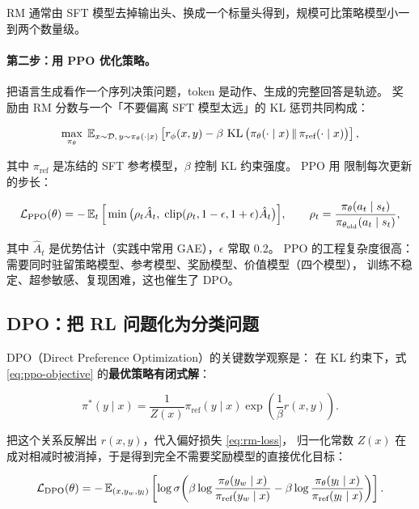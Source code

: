 RM 通常由 SFT 模型去掉输出头、换成一个标量头得到，规模可比策略模型小一到两个数量级。

\paragraph{第二步：用 PPO 优化策略。}
把语言生成看作一个序列决策问题，token 是动作、生成的完整回答是轨迹。
奖励由 RM 分数与一个「不要偏离 SFT 模型太远」的 KL 惩罚共同构成：

\begin{equation}
\max_{\pi_\theta} \; \operatorname{\mathbb{E}}_{x \sim \mathcal{D},\, y \sim \pi_\theta(\cdot \mid x)}
\left[ r_\phi(x, y) - \beta \, \operatorname{KL}\big( \pi_\theta(\cdot \mid x) \,\|\, \pi_{\text{ref}}(\cdot \mid x) \big) \right],
\label{eq:ppo-objective}
\end{equation}

其中 $\pi_{\text{ref}}$ 是冻结的 SFT 参考模型，$\beta$ 控制 KL 约束强度。
PPO 用 限制每次更新的步长：

\begin{equation}
\mathcal{L}_{\text{PPO}}(\theta) = - \operatorname{\mathbb{E}}_t \Big[ \min\big( \rho_t \hat{A}_t,\;
\text{clip}(\rho_t, 1-\epsilon, 1+\epsilon) \hat{A}_t \big) \Big],
\qquad \rho_t = \frac{\pi_\theta(a_t \mid s_t)}{\pi_{\theta_{\text{old}}}(a_t \mid s_t)} ,
\label{eq:ppo-clip}
\end{equation}

其中 $\hat{A}_t$ 是优势估计（实践中常用 GAE），$\epsilon$ 常取 0.2。
PPO 的工程复杂度很高：需要同时驻留策略模型、参考模型、奖励模型、价值模型（四个模型），
训练不稳定、超参敏感、复现困难，这也催生了 DPO。

\subsection{DPO：把 RL 问题化为分类问题}

DPO（Direct Preference Optimization）的关键数学观察是：
在 KL 约束下，式 \eqref{eq:ppo-objective} 的\textbf{最优策略有闭式解}：

$$\pi^*(y \mid x) = \frac{1}{Z(x)} \pi_{\text{ref}}(y \mid x) \exp\!\left( \frac{1}{\beta} r(x, y) \right).$$

把这个关系反解出 $r(x,y)$，代入偏好损失 \eqref{eq:rm-loss}，
归一化常数 $Z(x)$ 在成对相减时被消掉，于是得到完全不需要奖励模型的直接优化目标：

\begin{equation}
\mathcal{L}_{\text{DPO}}(\theta) = - \operatorname{\mathbb{E}}_{(x, y_w, y_l)}
\left[ \log \operatorname{\sigma}\!\left( \beta \log \frac{\pi_\theta(y_w \mid x)}{\pi_{\text{ref}}(y_w \mid x)}
- \beta \log \frac{\pi_\theta(y_l \mid x)}{\pi_{\text{ref}}(y_l \mid x)} \right) \right].
\label{eq:dpo}
\end{equation}

